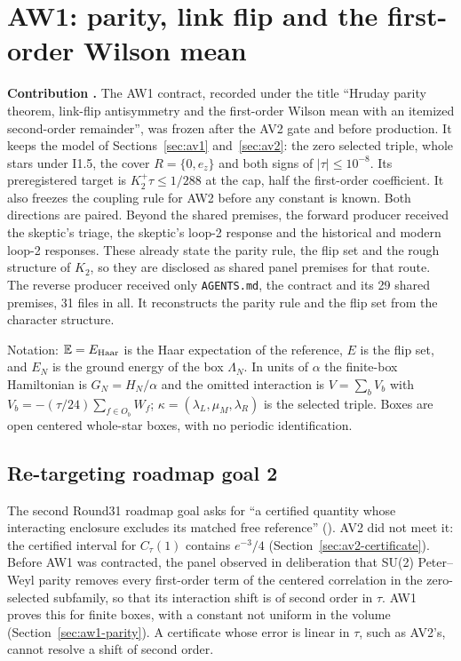 \section{AW1: parity, link flip and the first-order Wilson mean}
\label{sec:aw1}

\textbf{Contribution .} The AW1 contract, recorded under
the title ``Hruday parity theorem, link-flip antisymmetry and the first-order
Wilson mean with an itemized second-order remainder'', was frozen after the
AV2 gate and before production. It keeps the model of
Sections~\ref{sec:av1} and~\ref{sec:av2}: the zero selected triple, whole
stars under I1.5, the cover $R=\{0,e_z\}$ and both signs of
$|\tau|\le10^{-8}$. Its preregistered target is $K_2^+\tau\le1/288$ at the
cap, half the first-order coefficient. It also freezes the coupling rule for
AW2 before any constant is known. Both directions are paired. Beyond the
shared premises, the forward producer received the skeptic's triage, the
skeptic's loop-2 response and the historical and modern loop-2 responses.
These already state the parity rule, the flip set and the rough structure of
$K_2$, so they are disclosed as shared panel premises for that route. The
reverse producer received only \texttt{AGENTS.md}, the contract and its 29
shared premises, 31 files in all. It reconstructs the parity rule and the flip
set from the character structure.

Notation: $\mathbb E=E_{\rm Haar}$ is the Haar expectation of the reference,
$E$ is the flip set, and $E_N$ is the ground energy of the box $\Lambda_N$. In
units of $\alpha$ the finite-box Hamiltonian is $G_N=H_N/\alpha$ and the
omitted interaction is $V=\sum_bV_b$ with $V_b=-(\tau/24)\sum_{f\in O_b}W_f$;
$\kappa=(\lambda_L,\mu_M,\lambda_R)$ is the selected triple. Boxes are open
centered whole-star boxes, with no periodic identification.

\subsection{Re-targeting roadmap goal 2}
\label{sec:aw1-retarget}
The second Round31 roadmap goal asks for ``a certified quantity whose
interacting enclosure excludes its matched free reference''
(). AV2 did not
meet it: the certified interval for $C_\tau(1)$ contains $e^{-3}/4$
(Section~\ref{sec:av2-certificate}). Before AW1 was contracted, the panel
observed in deliberation that SU(2) Peter--Weyl parity removes every
first-order term of the centered correlation in the zero-selected subfamily,
so that its interaction shift is of second order in $\tau$. AW1 proves this
for finite boxes, with a constant not uniform in the volume
(Section~\ref{sec:aw1-parity}). A certificate whose error is linear in
$\tau$, such as AV2's, cannot resolve a shift of second order.

